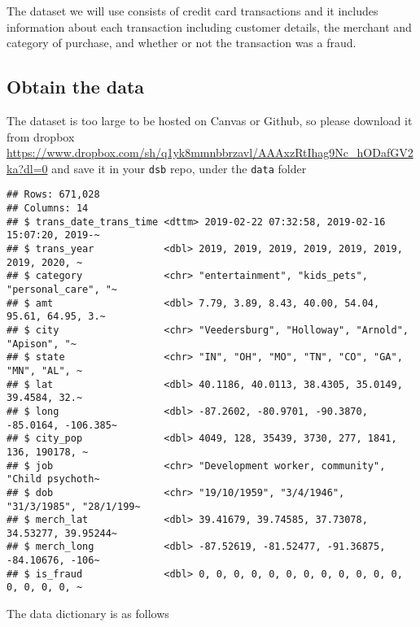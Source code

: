 \documentclass[
]{article}
\begin{document}
The dataset we will use consists of credit card transactions and it
includes information about each transaction including customer details,
the merchant and category of purchase, and whether or not the
transaction was a fraud.

\hypertarget{obtain-the-data-1}{%
\subsection{Obtain the data}\label{obtain-the-data-1}}

The dataset is too large to be hosted on Canvas or Github, so please
download it from dropbox
\url{https://www.dropbox.com/sh/q1yk8mmnbbrzavl/AAAxzRtIhag9Nc_hODafGV2ka?dl=0}
and save it in your \texttt{dsb} repo, under the \texttt{data} folder

\begin{verbatim}
## Rows: 671,028
## Columns: 14
## $ trans_date_trans_time <dttm> 2019-02-22 07:32:58, 2019-02-16 15:07:20, 2019-~
## $ trans_year            <dbl> 2019, 2019, 2019, 2019, 2019, 2019, 2019, 2020, ~
## $ category              <chr> "entertainment", "kids_pets", "personal_care", "~
## $ amt                   <dbl> 7.79, 3.89, 8.43, 40.00, 54.04, 95.61, 64.95, 3.~
## $ city                  <chr> "Veedersburg", "Holloway", "Arnold", "Apison", "~
## $ state                 <chr> "IN", "OH", "MO", "TN", "CO", "GA", "MN", "AL", ~
## $ lat                   <dbl> 40.1186, 40.0113, 38.4305, 35.0149, 39.4584, 32.~
## $ long                  <dbl> -87.2602, -80.9701, -90.3870, -85.0164, -106.385~
## $ city_pop              <dbl> 4049, 128, 35439, 3730, 277, 1841, 136, 190178, ~
## $ job                   <chr> "Development worker, community", "Child psychoth~
## $ dob                   <chr> "19/10/1959", "3/4/1946", "31/3/1985", "28/1/199~
## $ merch_lat             <dbl> 39.41679, 39.74585, 37.73078, 34.53277, 39.95244~
## $ merch_long            <dbl> -87.52619, -81.52477, -91.36875, -84.10676, -106~
## $ is_fraud              <dbl> 0, 0, 0, 0, 0, 0, 0, 0, 0, 0, 0, 0, 0, 0, 0, 0, ~
\end{verbatim}

The data dictionary is as follows
\end{document}

